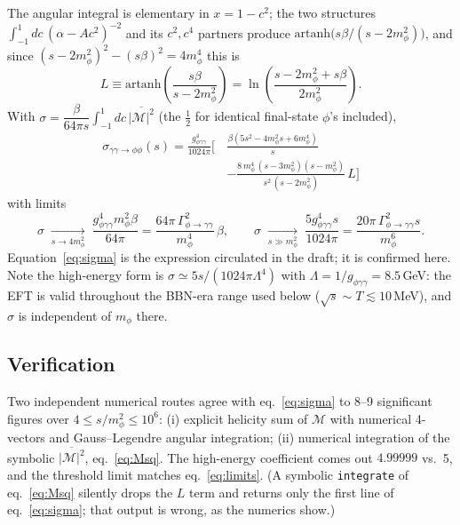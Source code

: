 \documentclass{article}
\newcommand{\Ggg}{\Gamma_{\phi\to\gamma\gamma}}
\begin{document}
The angular integral is elementary in $x=1-c^2$; the two structures
$\int_{-1}^{1}\!dc\,(\alpha-Ac^2)^{-2}$ and its $c^2,c^4$ partners produce
$\mathrm{artanh}\big(s\beta/(s-2m_\phi^2)\big)$, and since
$(s-2m_\phi^2)^2-(s\beta)^2=4m_\phi^4$ this is
%
\begin{equation}
  L \equiv \mathrm{artanh}\!\left(\frac{s\beta}{s-2m_\phi^2}\right)
    = \ln\!\left(\frac{s-2m_\phi^2+s\beta}{2m_\phi^2}\right).
\end{equation}
%
With $\sigma = \dfrac{\beta}{64\pi s}\displaystyle\int_{-1}^{1}\!dc\,
\overline{|\mathcal{M}|^2}$ (the $\tfrac12$ for identical final-state $\phi$'s
included),
%
\begin{equation}
\boxed{\;
\begin{split}
  \sigma_{\gamma\gamma\to\phi\phi}(s) = \frac{g_{\phi\gamma\gamma}^{4}}{1024\pi}\Bigg[\,
    &\frac{\beta\left(5s^{2}-4m_\phi^{2}s+6m_\phi^{4}\right)}{s} \\[2pt]
    &- \frac{8\,m_\phi^{4}\,(s-3m_\phi^{2})(s-m_\phi^{2})}{s^{2}\,(s-2m_\phi^{2})}\,
      L
  \Bigg]\;
\end{split}}
  \label{eq:sigma}
\end{equation}
%
with limits
%
\begin{equation}
  \sigma \;\xrightarrow[s\to4m_\phi^2]{}\;
  \frac{g_{\phi\gamma\gamma}^{4}m_\phi^{2}\beta}{64\pi}
  = \frac{64\pi\,\Ggg^{2}}{m_\phi^{4}}\,\beta,
  \qquad
  \sigma \;\xrightarrow[s\gg m_\phi^2]{}\;
  \frac{5g_{\phi\gamma\gamma}^{4}s}{1024\pi}
  = \frac{20\pi\,\Ggg^{2}s}{m_\phi^{6}} .
  \label{eq:limits}
\end{equation}
%
Equation~\eqref{eq:sigma} is the expression circulated in the draft; it is
confirmed here. Note the high-energy form is $\sigma\simeq
5s/(1024\pi\Lambda^4)$ with $\Lambda=1/g_{\phi\gamma\gamma}=8.5\,$GeV: the EFT
is valid throughout the BBN-era range used below ($\sqrt{s}\sim T\lesssim
10\,$MeV), and $\sigma$ is independent of $m_\phi$ there.

\subsection*{Verification}

Two independent numerical routes agree with eq.~\eqref{eq:sigma} to 8--9
significant figures over $4\le s/m_\phi^2\le10^6$:
(i) explicit helicity sum of $\mathcal{M}$ with numerical 4-vectors and
Gauss--Legendre angular integration; (ii) numerical integration of the
symbolic $\overline{|\mathcal{M}|^2}$, eq.~\eqref{eq:Msq}. The high-energy
coefficient comes out $4.99999$ vs.\ 5, and the threshold limit matches
eq.~\eqref{eq:limits}. (A symbolic \texttt{integrate} of eq.~\eqref{eq:Msq}
silently drops the $L$ term and returns only the first line of
eq.~\eqref{eq:sigma}; that output is wrong, as the numerics show.)
\end{document}
